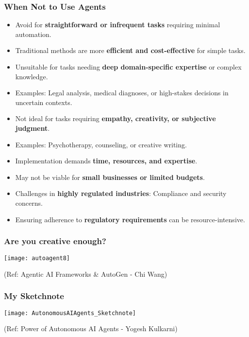 \begin{frame}[fragile]\frametitle{When Not to Use Agents}
\begin{itemize}
    \item Avoid for \textbf{straightforward or infrequent tasks} requiring minimal automation.
    \item Traditional methods are more \textbf{efficient and cost-effective} for simple tasks.
    \item Unsuitable for tasks needing \textbf{deep domain-specific expertise} or complex knowledge.
    \item Examples: Legal analysis, medical diagnoses, or high-stakes decisions in uncertain contexts.
    \item Not ideal for tasks requiring \textbf{empathy, creativity, or subjective judgment}.
    \item Examples: Psychotherapy, counseling, or creative writing.
    \item Implementation demands \textbf{time, resources, and expertise}.
    \item May not be viable for \textbf{small businesses or limited budgets}.
    \item Challenges in \textbf{highly regulated industries}: Compliance and security concerns.
    \item Ensuring adherence to \textbf{regulatory requirements} can be resource-intensive.
\end{itemize}
\end{frame}


\begin{frame}[fragile]\frametitle{Are you creative enough?}
		\begin{center}
		\texttt{[image: autoagent8]}
		\end{center}
		
		{\tiny (Ref: Agentic AI Frameworks \& AutoGen - Chi Wang)}
\end{frame}
  

\begin{frame}[fragile]\frametitle{My Sketchnote}
	
	\begin{center}
	\texttt{[image: AutonomousAIAgents\_Sketchnote]}
	\end{center}
{\tiny (Ref: Power of Autonomous AI Agents - Yogesh Kulkarni)}
\end{frame}

